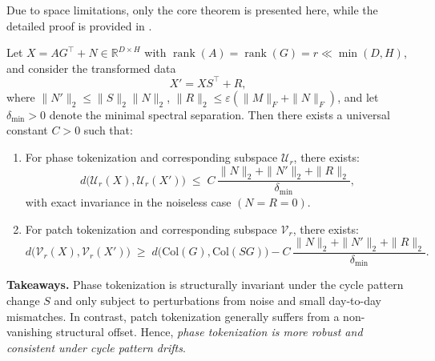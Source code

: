 Due to space limitations, only the core theorem is presented here, while the detailed proof is provided in .
\begin{theorem}
Let $X = A G^\top + N \in \mathbb{R}^{D\times H}$ with 
$\operatorname{rank}(A)=\operatorname{rank}(G)=r \ll \min(D,H)$, 
and consider the transformed data
\begin{equation}
X' = X S^\top + R,
\end{equation}
where $\|N'\|_2 \le \|S\|_2\|N\|_2$, 
$\|R\|_2 \le \varepsilon(\|M\|_F+\|N\|_F)$, 
and let $\delta_{\min} > 0$ denote the minimal spectral separation. 
Then there exists a universal constant $C>0$ such that:
\begin{enumerate}[leftmargin=2em]
\item For phase tokenization and corresponding subspace $\mathcal U_r$, there exists:
\begin{equation}
d\big(\mathcal U_r(X),\mathcal U_r(X')\big)
\;\le\;
C\,\frac{\|N\|_2+\|N'\|_2+\|R\|_2}{\delta_{\min}},
\end{equation}
with exact invariance in the noiseless case $(N=R=0)$.
\item For patch tokenization and corresponding subspace $\mathcal V_r$, there exists:
\begin{equation}
d\big(\mathcal V_r(X),\mathcal V_r(X')\big)
\;\ge\;
d\big(\mathrm{Col}(G),\mathrm{Col}(S G)\big)
- C\,\frac{\|N\|_2+\|N'\|_2+\|R\|_2}{\delta_{\min}}.
\end{equation}
\end{enumerate}
\end{theorem}

\noindent
\textbf{Takeaways.} 
Phase tokenization is structurally invariant under the cycle pattern change $S$ and only subject to perturbations from noise and small day-to-day mismatches. 
In contrast, patch tokenization generally suffers from a non-vanishing structural offset. 
Hence, \emph{phase tokenization is more robust and consistent under cycle pattern drifts}.

